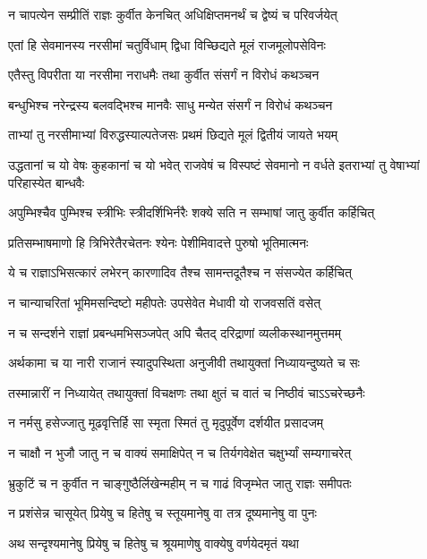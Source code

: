 \twolineshloka
{न चापत्येन सम्प्रीतिं राज्ञः कुर्वीत केनचित्}
{अधिक्षिप्तमनर्थं च द्वेष्यं च परिवर्जयेत्}


\twolineshloka
{एतां हि सेवमानस्य नरसीमां चतुर्विधाम्}
{द्विधा विच्छिद्यते मूलं राजमूलोपसेविनः}


\twolineshloka
{एतैस्तु विपरीता या नरसीमा नराधमैः}
{तथा कुर्वीत संसर्गं न विरोधं कथञ्चन}


\twolineshloka
{बन्धुभिश्च नरेन्द्रस्य बलवद्भिश्च मानवैः}
{साधु मन्येत संसर्गं न विरोधं कथञ्चन}


\twolineshloka
{ताभ्यां तु नरसीमाभ्यां विरुद्धस्याल्पतेजसः}
{प्रथमं छिद्यते मूलं द्वितीयं जायते भयम्}


\threelineshloka
{उद्धतानां च यो वेषः कुहकानां च यो भवेत्}
{राजवेषं च विस्पष्टं सेवमानो न वर्धते}
{इतराभ्यां तु वेषाभ्यां परिहास्येत बान्धवैः}


\twolineshloka
{अपुम्भिश्चैव पुम्भिश्च स्त्रीभिः स्त्रीदर्शिभिर्नरैः}
{शक्ये सति न सम्भाषां जातु कुर्वीत कर्हिचित्}


\twolineshloka
{प्रतिसम्भाषमाणो हि त्रिभिरेतैरचेतनः}
{श्येनः पेशीमिवादत्ते पुरुषो भूतिमात्मनः}


\twolineshloka
{ये च राज्ञाऽभिसत्कारं लभेरन् कारणादिव}
{तैश्च सामन्तदूतैश्च न संसज्येत कर्हिचित्}


\twolineshloka
{न चान्याचरितां भूमिमसन्दिष्टो महीपतेः}
{उपसेवेत मेधावी यो राजवसतिं वसेत्}


\twolineshloka
{न च सन्दर्शने राज्ञां प्रबन्धमभिसञ्जपेत्}
{अपि चैतद् दरिद्राणां व्यलीकस्थानमुत्तमम्}


\twolineshloka
{अर्थकामा च या नारी राजानं स्यादुपस्थिता}
{अनुजीवी तथायुक्तां निध्यायन्दुष्यते च सः}


\twolineshloka
{तस्मान्नारीं न निध्यायेत् तथायुक्तां विचक्षणः}
{तथा क्षुतं च वातं च निष्ठीवं चाऽऽचरेच्छनैः}


\twolineshloka
{न नर्मसु हसेज्जातु मूढवृत्तिर्हि सा स्मृता}
{स्मितं तु मृदुपूर्वेण दर्शयीत प्रसादजम्}


\twolineshloka
{न चाक्षौ न भुजौ जातु न च वाक्यं समाक्षिपेत्}
{न च तिर्यगवेक्षेत चक्षुर्भ्यां सम्यगाचरेत्}


\twolineshloka
{भ्रुकुटिं च न कुर्वीत न चाङ्गुष्ठैर्लिखेन्महीम्}
{न च गाढं विजृम्भेत जातु राज्ञः समीपतः}


\twolineshloka
{न प्रशंसेन्न चासूयेत् प्रियेषु च हितेषु च}
{स्तूयमानेषु वा तत्र दूष्यमानेषु वा पुनः}


\twolineshloka
{अथ सन्दृश्यमानेषु प्रियेषु च हितेषु च}
{श्रूयमाणेषु वाक्येषु वर्णयेदमृतं यथा}


